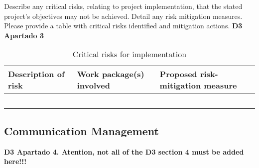 Describe any critical risks, relating to project implementation, that the stated project’s objectives may not be achieved. Detail any risk mitigation measures. Please provide a table with critical risks identified and mitigation actions. \textbf{D3 Apartado 3}

\begin{longtable}[H]{p{4cm} p{4.7cm} p{5cm}}
	\toprule[2pt]
	
	\textbf{Description of risk} & \textbf{Work package(s) involved} & \textbf{Proposed risk-mitigation measure} \\
	
	\midrule[1.5pt] 
	\endhead
	
	 &  &  \vspace{0.2cm} \\
	
	\midrule

	 &  &  \vspace{0.2cm} \\
	
	\midrule
	
	 &  &   \vspace{0.2cm} \\

	\midrule

 	 &  &   \vspace{0.2cm} \\
	
	\bottomrule[2pt]
	
	\caption{Critical risks for implementation}
	\label{workpackages}
\end{longtable}

\subsection{Communication Management}

\textbf{D3 Apartado 4. Atention, not all of the D3 section 4 must be added here!!!}